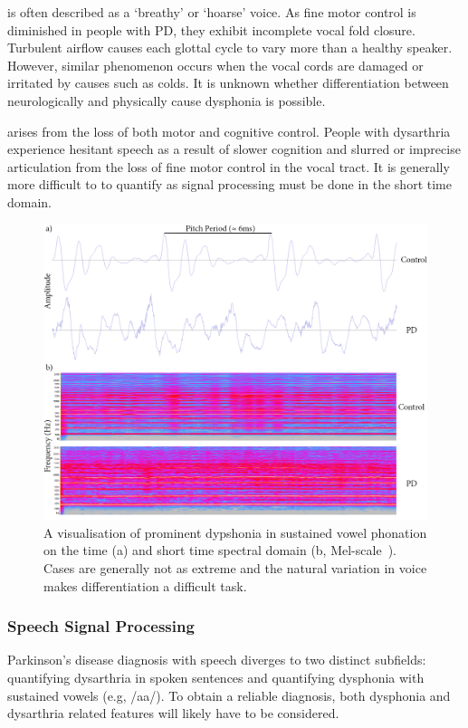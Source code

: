 \documentclass[12pt, twoside]{book}
\renewcommand\emph[1]{\textit{\color{USred}{#1}}}
\begin{document}
\emph{Dysphonia} is often described as a `breathy' or `hoarse' voice. As fine motor control is diminished in people with PD, they exhibit incomplete vocal fold closure. Turbulent airflow causes each glottal cycle to vary more than a healthy speaker. However, similar phenomenon occurs when the vocal cords are damaged or irritated by causes such as colds. It is unknown whether differentiation between neurologically and physically cause dysphonia is possible.  

\emph{Dysarthria} arises from the loss of both motor and cognitive control. People with dysarthria experience hesitant speech as a result of slower cognition and slurred or imprecise articulation from the loss of fine motor control in the vocal tract. It is generally more difficult to to quantify as signal processing must be done in the short time domain. 


\begin{figure}[h]
	\centering\centerline{\includegraphics[width=1.2\linewidth]{timespectrogram.png}}
	\caption{A visualisation of prominent dypshonia in sustained vowel phonation on the time (a) and short time spectral domain (b, Mel-scale~\cite{mfscale}). Cases are generally not as extreme and the natural variation in voice makes differentiation a difficult task.}
	\label{spectrogram}
\end{figure}


\subsubsection{Speech Signal Processing}
Parkinson's disease diagnosis with speech diverges to two distinct subfields: quantifying dysarthria in spoken sentences and quantifying dysphonia with sustained vowels (e.g, /aa/). To obtain a reliable diagnosis, both dysphonia and dysarthria related features will likely have to be considered.
\end{document}
